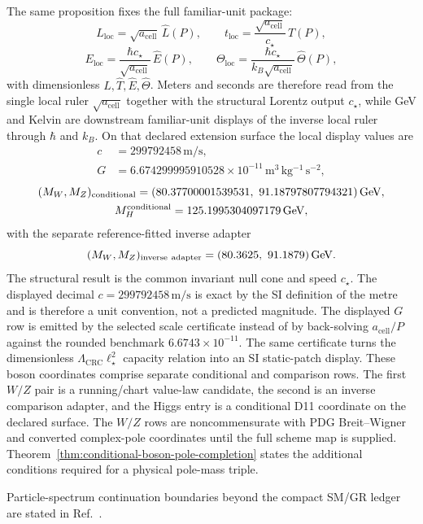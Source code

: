 \documentclass[11pt]{article}
\begin{document}
The same proposition fixes the full familiar-unit package:
\[
L_{\mathrm{loc}}=\sqrt{a_{\mathrm{cell}}}\,\widehat L(P),\qquad
t_{\mathrm{loc}}=\frac{\sqrt{a_{\mathrm{cell}}}}{c_\star}\,\widehat T(P),
\]
\[
E_{\mathrm{loc}}=\frac{\hbar c_\star}{\sqrt{a_{\mathrm{cell}}}}\,\widehat E(P),\qquad
\Theta_{\mathrm{loc}}=\frac{\hbar c_\star}{k_B\sqrt{a_{\mathrm{cell}}}}\,\widehat\Theta(P),
\]
with dimensionless \(\widehat L,\widehat T,\widehat E,\widehat\Theta\). Meters and seconds are
therefore read from the single local ruler \(\sqrt{a_{\mathrm{cell}}}\) together with the
structural Lorentz output \(c_\star\), while GeV and Kelvin are downstream familiar-unit displays of the
inverse local ruler through \(\hbar\) and \(k_B\).
On that declared extension surface the local display values are
\[
\begin{aligned}
c&=299792458\,\mathrm{m/s},\\
G&=6.674299995910528\times10^{-11}\,\mathrm{m^3\,kg^{-1}\,s^{-2}},
\end{aligned}
\]
\[
\begin{gathered}
(M_W,M_Z)_{\rm conditional}=
(80.37700001539531,\ 91.18797807794321)\,\mathrm{GeV},\\
M_H^{\rm conditional}=125.1995304097179\,\mathrm{GeV},
\end{gathered}
\]
with the separate reference-fitted inverse adapter
\[
(M_W,M_Z)_{\rm inverse\ adapter}=(80.3625,\ 91.1879)\,\mathrm{GeV}.
\]
The structural result is the common invariant null cone and speed \(c_\star\). The displayed
decimal \(c=299792458\,\mathrm{m/s}\) is exact by the SI definition of the metre and is therefore
a unit convention, not a predicted magnitude. The
displayed \(G\) row is emitted by the selected scale certificate instead of by
back-solving \(a_{\mathrm{cell}}/P\) against the rounded benchmark \(6.6743\times10^{-11}\). The
same certificate turns the dimensionless \(\Lambda_{\mathrm{CRC}}\ell_\star^2\)
capacity relation into an SI static-patch display.
These boson coordinates comprise separate conditional and comparison rows. The first \(W/Z\)
pair is a running/chart value-law candidate, the second is an inverse comparison
adapter, and the Higgs entry is a conditional D11 coordinate on the declared
surface. The \(W/Z\) rows are noncommensurate with PDG Breit--Wigner and converted complex-pole
coordinates until the full scheme map is supplied. Theorem~\ref{thm:conditional-boson-pole-completion}
states the additional conditions required for a physical pole-mass triple.

Particle-spectrum continuation boundaries beyond the compact SM/GR ledger are stated in Ref.~\cite{ophparticles}.
\end{document}
